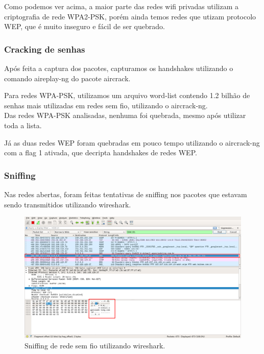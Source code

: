 \documentclass[
	article,			%
	12pt,				%
	oneside,			%
	a4paper,			%
	english,			%
	brazil,				%
	sumario=tradicional
	]{abntex2}
\begin{document}
Como podemos ver acima, a maior parte das redes wifi privadas utilizam a criptografia de rede WPA2-PSK, porém ainda temos redes que utizam protocolo WEP, que é muito inseguro e fácil de ser quebrado.

\subsubsection{Cracking de senhas}

Após feita a captura dos pacotes, capturamos os handshakes utilizando o comando aireplay-ng do pacote aircrack.\\


Para redes WPA-PSK, utilizamos um arquivo word-list contendo 1.2 bilhão de senhas mais utilizadas em redes sem fio, utilizando o aircrack-ng.\\

Das redes WPA-PSK analisadas, nenhuma foi quebrada, mesmo após utilizar toda a lista.\\


Já as duas redes WEP foram quebradas em pouco tempo utilizando o aircrack-ng com a flag 1 ativada, que decripta handshakes de redes WEP.

\subsubsection{Sniffing}

Nas redes abertas, foram feitas tentativas de sniffing nos pacotes que estavam sendo transmitidos utilizando wireshark.

\begin{figure}[H]
	\centering
	\caption{Sniffing de rede sem fio utilizando wireshark.}
	\includegraphics[scale=0.32]{captura-wireshark-1}
\end{figure}
\end{document}
